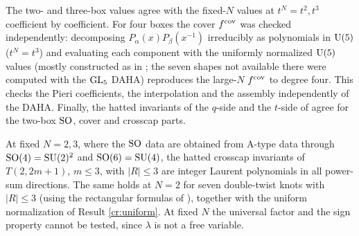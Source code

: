 \begin{result}
The two- and three-box values agree with the fixed-$N$ values at $t^N = t^2, t^3$ coefficient by coefficient. For four boxes the cover $f^{\mathrm{cov}}$ was checked independently: decomposing $P_\alpha(x)P_\beta(x^{-1})$ irreducibly as polynomials in $\mathrm{U}(5)$ ($t^N = t^3$) and evaluating each component with the uniformly normalized $\mathrm{U}(5)$ values (mostly constructed as in \cite{KN17}; the seven shapes not available there were computed with the $\mathrm{GL}_5$ DAHA) reproduces the large-$N$ $f^{\mathrm{cov}}$ to degree four. This checks the Pieri coefficients, the interpolation and the assembly independently of the DAHA.
Finally, the hatted invariants of the $q$-side and the $t$-side of \cite{KN17} agree for the two-box $\mathrm{SO}$, cover and crosscap parts.
\end{result}
\begin{result}[fixed $N$]\label{cr:fixedN}
At fixed $N = 2, 3$, where the $\mathrm{SO}$ data are obtained from A-type data through $\mathrm{SO}(4) = \mathrm{SU}(2)^2$ and $\mathrm{SO}(6) = \mathrm{SU}(4)$, the hatted crosscap invariants of $T(2,2m+1)$, $m \le 3$, with $|R| \le 3$ are integer Laurent polynomials in all power-sum directions. The same holds at $N = 2$ for seven double-twist knots with $|R| \le 3$ (using the rectangular formulas of \cite{KNTZ19}), together with the uniform normalization of Result \ref{cr:uniform}. At fixed $N$ the universal factor and the sign property cannot be tested, since $\lambda$ is not a free variable.
\end{result}

